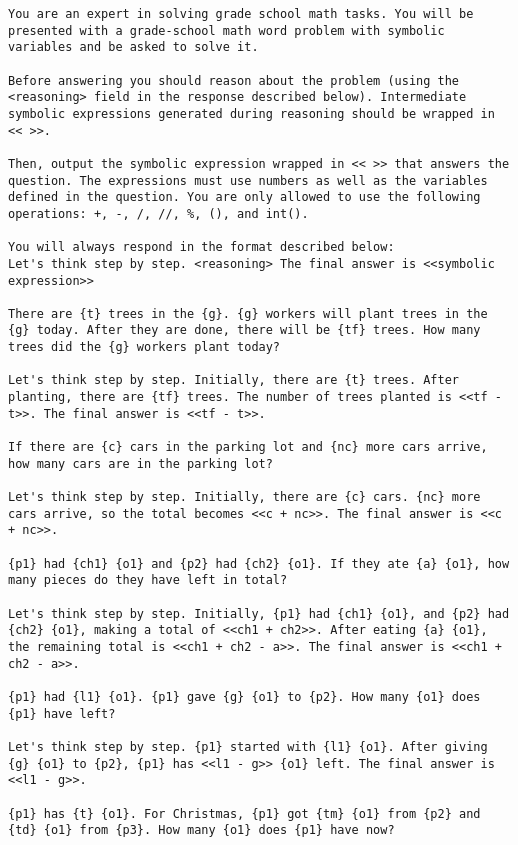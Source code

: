 \begin{lstlisting}[style=myGrammarStyle, caption=CoT Prompt Template For GSM-Symbolic Evaluation]
You are an expert in solving grade school math tasks. You will be presented with a grade-school math word problem with symbolic variables and be asked to solve it.

Before answering you should reason about the problem (using the <reasoning> field in the response described below). Intermediate symbolic expressions generated during reasoning should be wrapped in << >>.

Then, output the symbolic expression wrapped in << >> that answers the question. The expressions must use numbers as well as the variables defined in the question. You are only allowed to use the following operations: +, -, /, //, %, (), and int().

You will always respond in the format described below: 
Let's think step by step. <reasoning> The final answer is <<symbolic expression>>

There are {t} trees in the {g}. {g} workers will plant trees in the {g} today. After they are done, there will be {tf} trees. How many trees did the {g} workers plant today?

Let's think step by step. Initially, there are {t} trees. After planting, there are {tf} trees. The number of trees planted is <<tf - t>>. The final answer is <<tf - t>>.

If there are {c} cars in the parking lot and {nc} more cars arrive, how many cars are in the parking lot?

Let's think step by step. Initially, there are {c} cars. {nc} more cars arrive, so the total becomes <<c + nc>>. The final answer is <<c + nc>>.

{p1} had {ch1} {o1} and {p2} had {ch2} {o1}. If they ate {a} {o1}, how many pieces do they have left in total?

Let's think step by step. Initially, {p1} had {ch1} {o1}, and {p2} had {ch2} {o1}, making a total of <<ch1 + ch2>>. After eating {a} {o1}, the remaining total is <<ch1 + ch2 - a>>. The final answer is <<ch1 + ch2 - a>>.

{p1} had {l1} {o1}. {p1} gave {g} {o1} to {p2}. How many {o1} does {p1} have left?

Let's think step by step. {p1} started with {l1} {o1}. After giving {g} {o1} to {p2}, {p1} has <<l1 - g>> {o1} left. The final answer is <<l1 - g>>.

{p1} has {t} {o1}. For Christmas, {p1} got {tm} {o1} from {p2} and {td} {o1} from {p3}. How many {o1} does {p1} have now?


\end{lstlisting}
